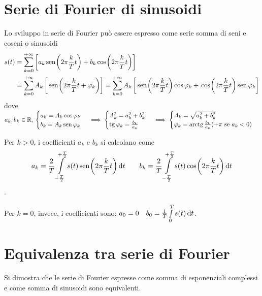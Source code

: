 \section{Serie di Fourier di sinusoidi}
Lo sviluppo in serie di Fourier può essere espresso come serie somma di seni e coseni o sinusoidi
\begin{align*}
s(t)&=\sum_{k=0}^{+\infty}\left[ a_k \,{\operatorname{sen}}^{}\!\left({2\pi\frac{k}{T}t}\right) + b_k \,{\operatorname{cos}}^{}\!\left({2\pi\frac{k}{T}t}\right)\right] \\
&=\sum_{k=0}^{+\infty}A_k\left[\,{\operatorname{sen}}^{}\!\left({2\pi\frac{k}{T}t+\varphi_k}\right)\right] =\sum_{k=0}^{+\infty}A_k\left[\,{\operatorname{sen}}^{}\!\left({2\pi\frac{k}{T}t}\right)\operatorname{cos}\varphi_k +\,{\operatorname{cos}}^{}\!\left({2\pi\frac{k}{T}t}\right)\operatorname{sen}\varphi_k \right]
\end{align*}
dove $a_k,b_k \in\mathbb{R},\,\begin{cases}a_k=A_k\operatorname{cos}\varphi_k \\b_k=A_k\operatorname{sen}\varphi_k \end{cases}\implies\begin{cases}A_k^2=a_k^2+b_k^2\\ \operatorname{tg}\varphi_k=\frac{b_k}{a_k} \end{cases}\implies\begin{cases}A_k=\sqrt{a_k^2+b_k^2}\\ \varphi_k=\operatorname{arctg}\frac{b_k}{a_k} (+\pi\text{ se }a_k<0) \end{cases}$

Per $k>0$, i coefficienti $a_k$ e $b_k$ si calcolano come
\[a_k=\frac{2}{T}\int\limits_{-\frac{T}{2}}^{+\frac{T}{2}}{s(t)\,{\operatorname{sen}}^{}\!\left({2\pi\frac{k}{T}t}\right)}{\,\mathop{}\!\mathrm{d}{t}} \qquad b_k=\frac{2}{T}\int\limits_{-\frac{T}{2}}^{+\frac{T}{2}}{s(t)\,{\operatorname{cos}}^{}\!\left({2\pi\frac{k}{T}t}\right)}{\,\mathop{}\!\mathrm{d}{t}}\].

Per $k=0$, invece, i coefficienti sono: $a_0=0 \quad b_0=\frac{1}{T}\int\limits_{0}^{T}{s(t)}{\,\mathop{}\!\mathrm{d}{t}}$.

\section{Equivalenza tra serie di Fourier}
Si dimostra che le serie di Fourier espresse come somma di esponenziali complessi e come somma di sinusoidi sono equivalenti.

